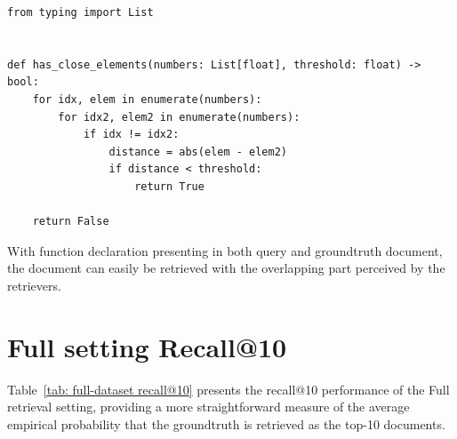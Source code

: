 \documentclass{article} %
\begin{document}
\begin{minipage}{\linewidth}
\small\begin{verbatim}
from typing import List


def has_close_elements(numbers: List[float], threshold: float) -> bool:
    for idx, elem in enumerate(numbers):
        for idx2, elem2 in enumerate(numbers):
            if idx != idx2:
                distance = abs(elem - elem2)
                if distance < threshold:
                    return True

    return False
\end{verbatim}
\end{minipage}


With function declaration presenting in both query and groundtruth document, the document can easily be retrieved with the overlapping part perceived by the retrievers.

\section{Full setting Recall@10}
\label{appendix: full recall}

Table~\ref{tab: full-dataset recall@10} presents the recall@10 performance of the Full retrieval setting, providing a more straightforward measure of the average empirical probability that the groundtruth is retrieved as the top-10 documents.


\end{document}
